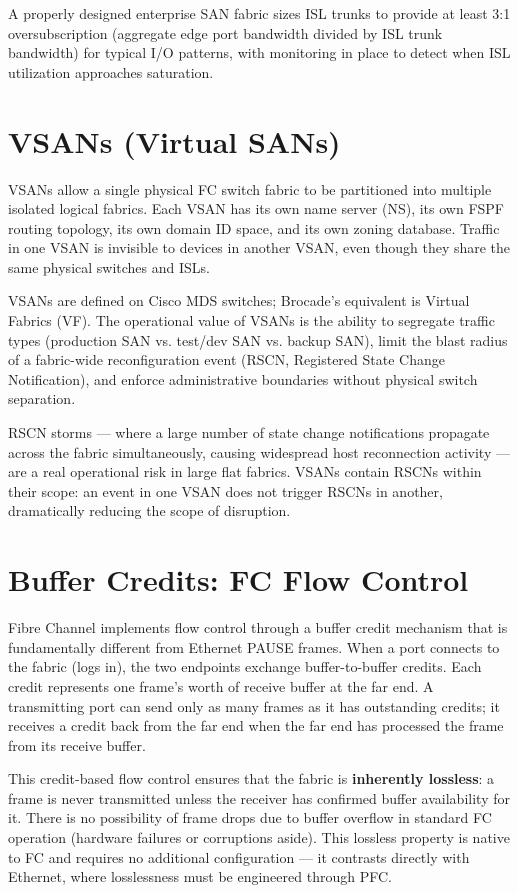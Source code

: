 A properly designed enterprise SAN fabric sizes ISL trunks to provide at least 3:1 oversubscription (aggregate edge port bandwidth divided by ISL trunk bandwidth) for typical I/O patterns, with monitoring in place to detect when ISL utilization approaches saturation.

\section{VSANs (Virtual SANs)}
VSANs allow a single physical FC switch fabric to be partitioned into multiple isolated logical fabrics. Each VSAN has its own name server (NS), its own FSPF routing topology, its own domain ID space, and its own zoning database. Traffic in one VSAN is invisible to devices in another VSAN, even though they share the same physical switches and ISLs.

VSANs are defined on Cisco MDS switches; Brocade's equivalent is Virtual Fabrics (VF). The operational value of VSANs is the ability to segregate traffic types (production SAN vs. test/dev SAN vs. backup SAN), limit the blast radius of a fabric-wide reconfiguration event (RSCN, Registered State Change Notification), and enforce administrative boundaries without physical switch separation.

RSCN storms --- where a large number of state change notifications propagate across the fabric simultaneously, causing widespread host reconnection activity --- are a real operational risk in large flat fabrics. VSANs contain RSCNs within their scope: an event in one VSAN does not trigger RSCNs in another, dramatically reducing the scope of disruption.

\section{Buffer Credits: FC Flow Control}
Fibre Channel implements flow control through a buffer credit mechanism that is fundamentally different from Ethernet PAUSE frames. When a port connects to the fabric (logs in), the two endpoints exchange buffer-to-buffer credits. Each credit represents one frame's worth of receive buffer at the far end. A transmitting port can send only as many frames as it has outstanding credits; it receives a credit back from the far end when the far end has processed the frame from its receive buffer.

This credit-based flow control ensures that the fabric is \textbf{inherently lossless}: a frame is never transmitted unless the receiver has confirmed buffer availability for it. There is no possibility of frame drops due to buffer overflow in standard FC operation (hardware failures or corruptions aside). This lossless property is native to FC and requires no additional configuration --- it contrasts directly with Ethernet, where losslessness must be engineered through PFC.

